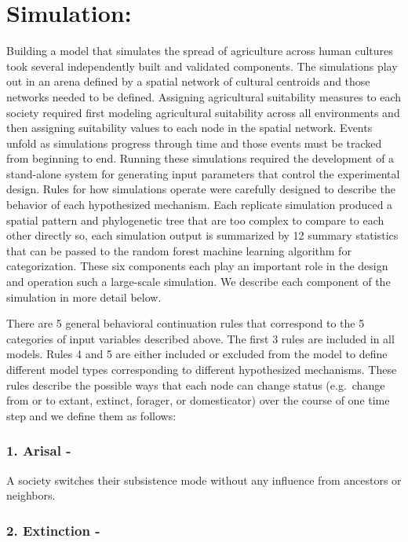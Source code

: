 \documentclass[]{book}
\theoremstyle{definition}
\theoremstyle{definition}
\theoremstyle{definition}
\theoremstyle{remark}
\begin{document}
\section{Simulation:}\label{simulation}

Building a model that simulates the spread of agriculture across human
cultures took several independently built and validated components. The
simulations play out in an arena defined by a spatial network of
cultural centroids and those networks needed to be defined. Assigning
agricultural suitability measures to each society required first
modeling agricultural suitability across all environments and then
assigning suitability values to each node in the spatial network. Events
unfold as simulations progress through time and those events must be
tracked from beginning to end. Running these simulations required the
development of a stand-alone system for generating input parameters that
control the experimental design. Rules for how simulations operate were
carefully designed to describe the behavior of each hypothesized
mechanism. Each replicate simulation produced a spatial pattern and
phylogenetic tree that are too complex to compare to each other directly
so, each simulation output is summarized by 12 summary statistics that
can be passed to the random forest machine learning algorithm for
categorization. These six components each play an important role in the
design and operation such a large-scale simulation. We describe each
component of the simulation in more detail below.

There are 5 general behavioral continuation rules that correspond to the
5 categories of input variables described above. The first 3 rules are
included in all models. Rules 4 and 5 are either included or excluded
from the model to define different model types corresponding to
different hypothesized mechanisms. These rules describe the possible
ways that each node can change status (e.g.~change from or to extant,
extinct, forager, or domesticator) over the course of one time step and
we define them as follows:

\subsubsection{1. Arisal -}\label{arisal--}

A society switches their subsistence mode without any influence from
ancestors or neighbors.

\subsubsection{2. Extinction -}\label{extinction--}
\end{document}
